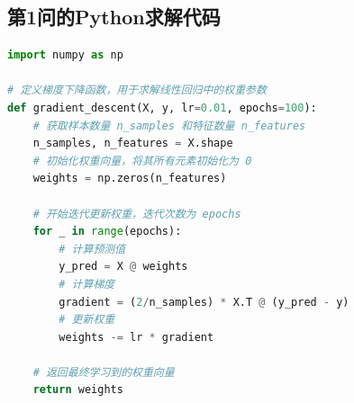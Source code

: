 \documentclass{jyuthesis}
\let\oldsection\section
\renewcommand\section{\clearpage\oldsection}  %
\begin{document}
\newpage
\begin{appendices}

\section{第1问的Python求解代码}
\label{append_python}

\begin{lstlisting}[language=Python]
import numpy as np

# 定义梯度下降函数，用于求解线性回归中的权重参数
def gradient_descent(X, y, lr=0.01, epochs=100):
    # 获取样本数量 n_samples 和特征数量 n_features
    n_samples, n_features = X.shape
    # 初始化权重向量，将其所有元素初始化为 0
    weights = np.zeros(n_features)
    
    # 开始迭代更新权重，迭代次数为 epochs
    for _ in range(epochs):
        # 计算预测值
        y_pred = X @ weights
        # 计算梯度
        gradient = (2/n_samples) * X.T @ (y_pred - y)
        # 更新权重
        weights -= lr * gradient
    
    # 返回最终学习到的权重向量
    return weights
\end{lstlisting}

\end{appendices}
\end{document}
